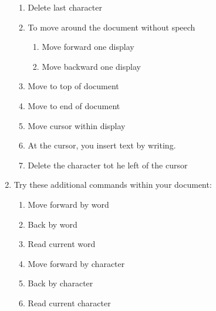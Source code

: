 \documentclass[10pt,letterpaper,twoside]{report}
\begin{document}
\begin{enumerate}
\begin{enumerate}
		      \item Delete last character 
		      \item To move around the document without speech 
		            \begin{enumerate}
			            \item Move forward one display 
			            \item Move backward one display 
		            \end{enumerate}
		      \item Move to top of document 
		      \item Move to end of document 
		      \item Move cursor within display 
		      \item At the cursor, you insert text by writing.
		      \item Delete the character tot he left of the cursor 
	      \end{enumerate}
	\item Try these additional commands within your document:
	      \begin{enumerate}
		      \item Move forward by word 
		      \item Back by word 
		      \item Read current word 
		      \item Move forward by character 
		      \item Back by character 
		      \item Read current character 

\end{enumerate}
\end{enumerate}
\end{document}
